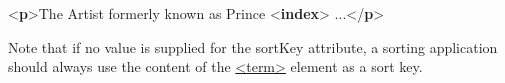 \begin{shaded}
{<\textbf{p}>}The Artist formerly known as Prince {<\textbf{index}>}\mbox{}\newline 
\hspace*{1em}\mbox{}\newline 
\hspace*{1em}\hspace*{1em}\mbox{}\newline 
\hspace*{1em}\mbox{}\newline 
{}...{</\textbf{p}>}\end{shaded}\egroup\par \noindent  Note that if no value is supplied for the sortKey attribute, a sorting application should always use the content of the \hyperref[TEI.term]{<term>} element as a sort key.\par
